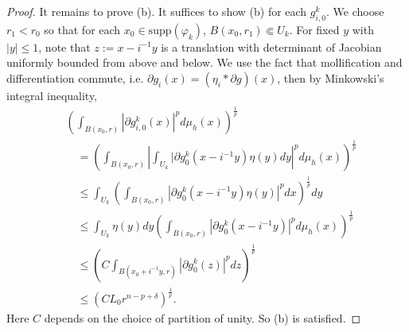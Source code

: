 \documentclass[12pt]{amsart}
\theoremstyle{plain}
\theoremstyle{plain}
\theoremstyle{definition}
\theoremstyle{remark}
\numberwithin{equation}{subsection}
\begin{document}
\begin{proof}
  It remains to prove (b). It suffices to show (b) for each $g_{i,0}^k$. We choose $r_1<r_0$ so that for each $x_0\in \mathrm{supp}(\varphi_k)$, $B(x_0,r_1)\Subset U_k$. For fixed $y$ with $|y| \leq 1$, note that $z:= x-i^{-1}y$ is a translation with determinant of Jacobian uniformly bounded from above and below. We use the fact that mollification and differentiation commute, i.e. $\partial g_i(x) = (\eta_i \ast \partial g)(x)$, then by Minkowski's integral inequality,
    \begin{align*}
        &\left(\int_{B(x_0,r)}|\partial g_{i,0}^k(x)|^pd\mu_h(x)\right)^\frac{1}{p} \nonumber \\
        &\quad= \left(\int_{B(x_0,r)}\left|\int_{U_k} |\partial g_0^k(x-i^{-1}y)\eta(y)dy\right|^{p}d\mu_h(x)\right)^\frac{1}{p} \nonumber \\
        &\quad\leq \int_{U_k} \left(\int_{B(x_0,r)}|\partial g_0^k(x-i^{-1}y)\eta(y)|^pdx\right)^\frac{1}{p}dy \nonumber \\
        &\quad\leq \int_{U_k}\eta(y)dy\left(\int_{B(x_0,r)} |\partial g_0^k(x-i^{-1}y)|^p d\mu_h(x)\right)^\frac{1}{p} \nonumber \\
        &\quad\leq \left(C\int_{B(x_0 + i^{-1}y, r)} |\partial g_0^k(z)|^p dz\right)^\frac{1}{p} \nonumber \\
        &\quad\leq \left(CL_0 r^{n-p+\delta}\right)^\frac{1}{p}.
    \end{align*}
 Here $C$ depends on the choice of partition of unity. So (b) is satisfied.
\end{proof}
\end{document}
